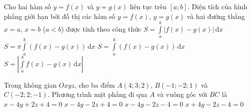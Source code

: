 \begin{ex}%
	Cho hai hàm số $y = f(x)$ và $y = g(x)$ liên tục trên $[a;b]$. Diện tích của hình phẳng giới hạn bởi đồ thị các hàm số $y = f(x)$, $y = g(x)$ và hai đường thẳng $x = a$, $x = b$ ($a < b$) được tính theo công thức	
	\choice
	{\True $S = \displaystyle\int\limits_{a}^{b} \left|f(x) - g(x) \right| \mathrm{\,d}x$}
	{$S = \pi \displaystyle\int\limits_{a}^{b} \left(f(x) - g(x) \right) \mathrm{\,d}x$}
	{$S = \displaystyle\int\limits_{a}^{b} \left(f(x) - g(x) \right) \mathrm{\,d}x$}
	{$S = \left| \displaystyle\int\limits_{a}^{b} f(x) - g(x)  \mathrm{\,d}x \right|$}
\end{ex} 

\begin{ex}%
	Trong không gian $Oxyz$, cho ba điểm $A(4;3;2)$, $B(-1;-2;1)$ và $C(-2;2;-1)$. Phương trình mặt phẳng đi qua $A$ và vuông góc với $BC$ là	
	\choice
	{\True $x - 4y + 2z + 4 = 0$}
	{$x - 4y - 2z + 4 = 0$}
	{$x - 4y - 2z - 4 = 0$}
	{$x + 4y - 2z - 4 = 0$}
\end{ex} 

